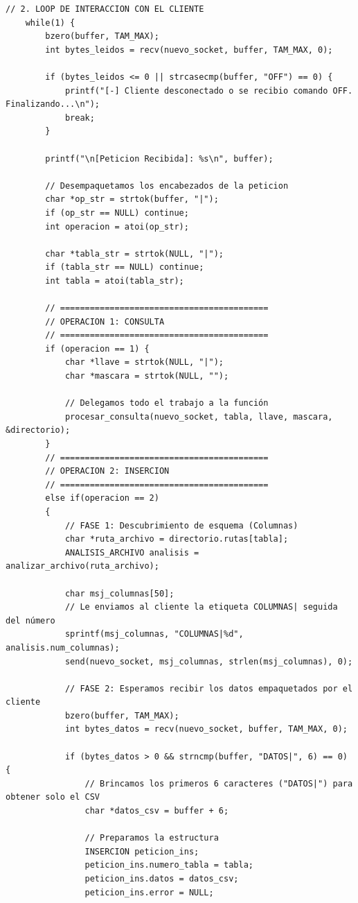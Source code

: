 \documentclass[12pt]{article}
\begin{document}
\begin{lstlisting}[style=estiloC ,title={Código 1. Servidor TCP (MAIN)}]
    // 2. LOOP DE INTERACCION CON EL CLIENTE
    while(1) {
        bzero(buffer, TAM_MAX);
        int bytes_leidos = recv(nuevo_socket, buffer, TAM_MAX, 0);
        
        if (bytes_leidos <= 0 || strcasecmp(buffer, "OFF") == 0) {
            printf("[-] Cliente desconectado o se recibio comando OFF. Finalizando...\n");
            break;
        }

        printf("\n[Peticion Recibida]: %s\n", buffer);

        // Desempaquetamos los encabezados de la peticion
        char *op_str = strtok(buffer, "|");
        if (op_str == NULL) continue;
        int operacion = atoi(op_str);

        char *tabla_str = strtok(NULL, "|");
        if (tabla_str == NULL) continue;
        int tabla = atoi(tabla_str);

        // ==========================================
        // OPERACION 1: CONSULTA
        // ==========================================
        if (operacion == 1) {
            char *llave = strtok(NULL, "|");
            char *mascara = strtok(NULL, ""); 
            
            // Delegamos todo el trabajo a la función
            procesar_consulta(nuevo_socket, tabla, llave, mascara, &directorio);
        }
        // ==========================================
        // OPERACION 2: INSERCION
        // ==========================================
        else if(operacion == 2) 
        {
            // FASE 1: Descubrimiento de esquema (Columnas)
            char *ruta_archivo = directorio.rutas[tabla];
            ANALISIS_ARCHIVO analisis = analizar_archivo(ruta_archivo);
            
            char msj_columnas[50];
            // Le enviamos al cliente la etiqueta COLUMNAS| seguida del número
            sprintf(msj_columnas, "COLUMNAS|%d", analisis.num_columnas);
            send(nuevo_socket, msj_columnas, strlen(msj_columnas), 0);

            // FASE 2: Esperamos recibir los datos empaquetados por el cliente
            bzero(buffer, TAM_MAX);
            int bytes_datos = recv(nuevo_socket, buffer, TAM_MAX, 0);

            if (bytes_datos > 0 && strncmp(buffer, "DATOS|", 6) == 0) {
                // Brincamos los primeros 6 caracteres ("DATOS|") para obtener solo el CSV
                char *datos_csv = buffer + 6; 

                // Preparamos la estructura
                INSERCION peticion_ins;
                peticion_ins.numero_tabla = tabla;
                peticion_ins.datos = datos_csv;
                peticion_ins.error = NULL;


\end{lstlisting}
\end{document}
